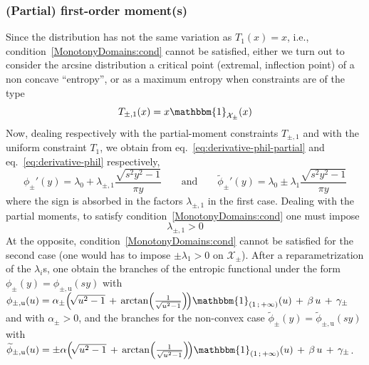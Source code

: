 \documentclass[entropy,article,submit,moreauthors,pdftex]{Definitions/mdpi}
\newcommand{\SZ}[1]{{\color{blue} #1}}                                       %
\def\X{\mathcal{X}}%
\def\un{\mathbbm{1}}%
\def\u{\mathrm{u}}
\begin{document}

\subsubsection{(Partial) first-order moment(s)}
\label{subsubsecapp:ArcsineFirstPartial}

\SZ{Since the  distribution has not  the same variation  as $T_1(x) =  x$, i.e.,
  condition~\ref{MonotonyDomains:cond} cannot  be satisfied, either we  turn out
  to consider  the arcsine distribution  a critical point  (extremal, inflection
  point) of a non concave ``entropy'',  or as a maximum entropy when constraints
  are of the type
%
\[
T_{\pm,1}(x) = x \un_{\X_\pm}(x)
\]
%
Now, dealing  respectively with  the partial-moment constraints  $T_{\pm,1}$ and
with     the      uniform     constraint      $T_1$,     we      obtain     from
eq.~\eqref{eq:derivative-phil-partial}     and    eq.~\eqref{eq:derivative-phil}
respectively,
%
\[
\phi_\pm'(y) =  \lambda_0 + \lambda_{\pm,1}  \frac{\sqrt{s^2  y^2 -
    1}}{\pi y} \qquad \mbox{and} \qquad \widetilde{\phi}_\pm'(y) = \lambda_0 \pm
\lambda_1 \frac{\sqrt{s^2 y^2 - 1}}{\pi y}
\]
%
where the sign  is absorbed in the factors $\lambda_{\pm,1}$  in the first case.
Dealing       with       the       partial       moments,       to       satisfy
condition~\ref{MonotonyDomains:cond} one must impose  $$\lambda_{\pm,1} > 0$$ At
the opposite,  condition~\ref{MonotonyDomains:cond} cannot be satisfied  for the
second case (one would  has to impose $\pm \lambda_1 > 0$  on $\X_\pm$). After a
reparametrization of the  $\lambda_i$s, one obtain the branches  of the entropic
functional   under   the   form   $\phi_\pm(y)  =   \phi_{\pm,\u}(s   y)$   with
$\phi_{\pm,\u}(u) = \alpha_\pm  \left( \!  \sqrt{u^2 - 1} \,  + \, \arctan\left(
\frac{1}{\sqrt{u^2  - 1}}  \right) \!   \right) \un_{\left(  1 \,  ; \,  +\infty
  \right)}(u) \, + \, \beta \, u \,  + \, \gamma_\pm$ and with $\alpha_\pm > 0$,
and   the  branches   for   the  non-convex   case  $\widetilde{\phi}_\pm(y)   =
\widetilde{\phi}_{\pm,\u}(s y)$ with  $\widetilde{\phi}_{\pm,\u}(u) = \pm \alpha
\left( \! \sqrt{u^2 - 1} \,  + \, \arctan\left( \frac{1}{\sqrt{u^2 - 1}} \right)
\! \right) \un_{\left( 1 \, ; \, +\infty \right)}(u)  \, + \, \beta \, u \, + \,
\gamma_\pm$.

}
\end{document}
